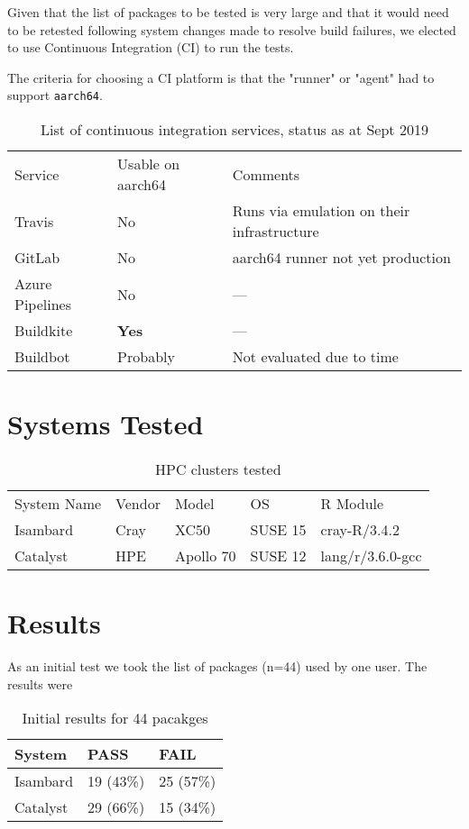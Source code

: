 \documentclass{article}
\begin{document}
Given that the list of packages to be tested is very large and that it would need to be retested following system changes made to resolve build failures, we elected to use Continuous Integration (\textsc{CI}) to run the tests.

The criteria for choosing a \textsc{CI} platform is that the "runner" or "agent" had to support \texttt{aarch64}.

\begin{table}[h]
\begin{tabular}{lll}
\cline{1-3}
Service & Usable on aarch64 & Comments\\ \cline{1-3}
Travis & No & Runs via emulation on their infrastructure\\
GitLab & No & aarch64 runner not yet production\\
Azure Pipelines & No & ---\\
Buildkite & \textbf{Yes} & --- \\
Buildbot & Probably & Not evaluated due to time \\ \cline{1-3}
\end{tabular}
\caption{List of continuous integration services, status as at Sept 2019}
\label{tab:ci-services}
\end{table}

\section{Systems Tested}

\begin{table}[h]
\begin{tabular}{lllll}
\cline{1-5}
System Name & Vendor & Model & OS & R Module \\ \cline{1-5}
Isambard & Cray & XC50 & SUSE 15 & cray-R/3.4.2 \\
Catalyst & HPE & Apollo 70 & SUSE 12 & lang/r/3.6.0-gcc \\ \cline{1-5}
\end{tabular}
\caption{HPC clusters tested }
\label{tab:systems}
\end{table}

\section{Results}

As an initial test we took the list of packages (n=44) used by one user. The results were 

\begin{table}[h]
\begin{tabular}{lll}
\hline
System & PASS & FAIL \\ \hline
Isambard & 19 (43\%) & 25 (57\%) \\
Catalyst & 29 (66\%) & 15 (34\%) \\ \hline
\end{tabular}
\caption{Initial results for 44 pacakges}
\label{tab:results-one-user}
\end{table}
\end{document}
